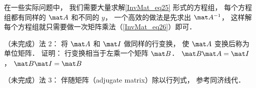 在一些实际问题中， 我们需要大量求解\autoref{InvMat_eq25} 形式的方程组， 每个方程组都有同样的 $\mat A$ 和不同的 $y$， 一个高效的做法是先求出 $\mat A^{-1}$， 这样解每个方程组就只需要做一次矩阵乘法（\autoref{InvMat_eq26}）即可．

（未完成）法 2： 将 $\mat A$ 和 $\mat I$ 做同样的行变换， 使 $\mat A$ 变换后称为单位矩阵． 证明： 行变换相当于左乘一个矩阵 $\mat B$． $\mat B\mat A = \mat I$， $\mat B \mat I = \mat B$

（未完成）法 3： 伴随矩阵（adjugate matrix）除以行列式， 参考同济线代．%
